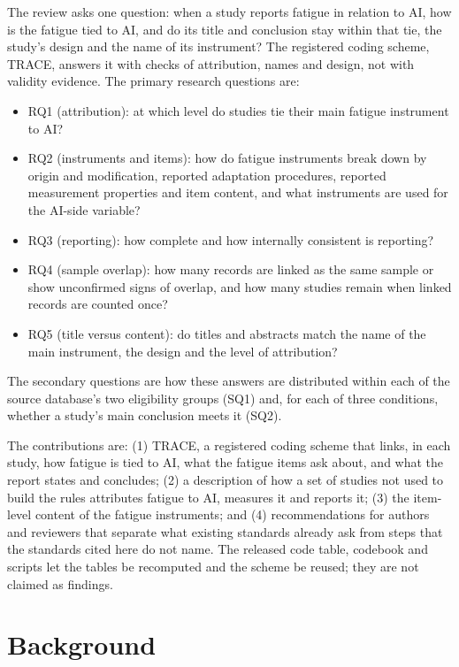 \documentclass[11pt]{article}
\begin{document}
The review asks one question: when a study reports fatigue in relation to AI, how is the fatigue tied to AI, and do
its title and conclusion stay within that tie, the study's design and the name of its instrument? The registered
coding scheme, TRACE, answers it with checks of attribution, names and design, not with validity evidence. The
primary research questions are:
\begin{itemize}
  \item RQ1 (attribution): at which level do studies tie their main fatigue instrument to AI?
  \item RQ2 (instruments and items): how do fatigue instruments break down by origin and modification, reported
  adaptation procedures, reported measurement properties and item content, and what instruments are used for the
  AI-side variable?
  \item RQ3 (reporting): how complete and how internally consistent is reporting?
  \item RQ4 (sample overlap): how many records are linked as the same sample or show unconfirmed signs of overlap, and
  how many studies remain when linked records are counted once?
  \item RQ5 (title versus content): do titles and abstracts match the name of the main instrument, the design and the
  level of attribution?
\end{itemize}
The secondary questions are how these answers are distributed within each of the source database's two eligibility
groups (SQ1) and, for each of three conditions, whether a study's main conclusion meets it (SQ2).

The contributions are: (1) TRACE, a registered coding scheme that links, in each study, how fatigue is tied to AI,
what the fatigue items ask about, and what the report states and concludes; (2) a description of how a set of studies
not used to build the rules attributes fatigue to AI, measures it and reports it; (3) the item-level content of the
fatigue instruments; and (4) recommendations for authors and reviewers that separate what existing standards already
ask from steps that the standards cited here do not name. The released code table, codebook and scripts let the tables
be recomputed and the scheme be reused; they are not claimed as findings.

\section{Background}
\end{document}
